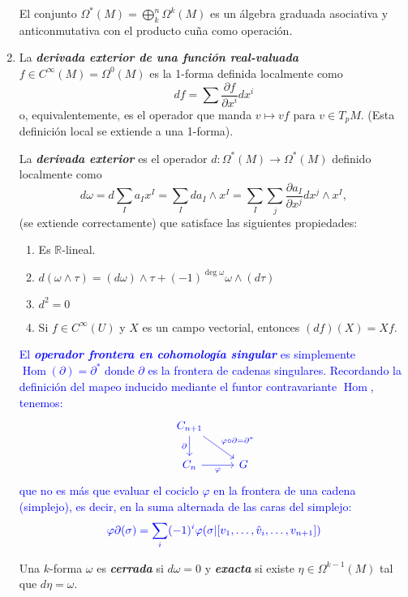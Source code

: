 \documentclass[spanish]{article}
\theoremstyle{definition}
\newcommand{\R}{\mathbb{R}}
\newcommand{\Cinf}{C^\infty}
\DeclareMathOperator{\Hom}{Hom}
\begin{document}
\begin{enumerate}
		El conjunto $\Omega^*(M)=\bigoplus_k^n\Omega^k(M)$ es un álgebra graduada asociativa y anticonmutativa con el producto cuña como operación.
		
		
		\item La \textbf{\textit{derivada exterior de una función real-valuada}} $f\in\Cinf(M)=\Omega^0(M)$ es la 1-forma definida localmente como
		\[df=\sum\frac{\partial f}{\partial x^i}dx^i\]
		o, equivalentemente, es el operador que manda $v\mapsto vf$ para $v\in T_pM$. (Esta definición local se extiende a una 1-forma).
		
		La \textbf{\textit{derivada exterior}} es el operador $d:\Omega^*(M)\to\Omega^*(M)$ definido localmente como
		\[d\omega=d\sum_Ia_Ix^I =\sum_Ida_I\wedge x^I=\sum_I\sum_j\frac{\partial a_I}{\partial x^j}dx^j\wedge x^I,\]
		(se extiende correctamente) que satisface las siguientes propiedades:
		\begin{enumerate}
			\item Es $\R$-lineal.
			\item $d(\omega\wedge\tau)=(d\omega)\wedge\tau+(-1)^{\deg\omega}\omega\wedge(d\tau)$
			\item $d^2=0$
			\item Si $f\in\Cinf(U)$ y $X$ es un campo vectorial, entonces $(df)(X)=Xf$.
			
		\end{enumerate}
		\textcolor{blue}{El \textbf{\textit{operador frontera en cohomología singular}} es simplemente $\Hom(\partial)=\partial^*$ donde $\partial$ es la frontera de cadenas singulares. Recordando la definición del mapeo inducido mediante el funtor contravariante $\Hom$, tenemos:}
		\[\begin{tikzcd}
			\textcolor{blue}{C_{n+1}}\arrow[d,blue,swap,"\partial"]\arrow[rd,blue,"\varphi\circ\partial=\partial^*"]\\	\textcolor{blue}{C_n}\arrow[blue,swap,r,"\varphi"]&\textcolor{blue}{G}
		\end{tikzcd}\]
		\textcolor{blue}{que no es más que evaluar el cociclo $\varphi$ en la frontera de una cadena (simplejo), es decir, en la suma alternada de las caras del simplejo:}
		\[\color{blue}\varphi\partial (\sigma)=\sum_i(-1)^i\varphi(\sigma|[v_1,\ldots,\hat{v}_i,\ldots,v_{n+1}])\]
		
		Una $k$-forma $\omega$ es \textbf{\textit{cerrada}} si $d\omega=0$ y \textbf{\textit{exacta}} si existe $\eta\in\Omega^{k-1}(M)$ tal que $d\eta=\omega$.
		

\end{enumerate}
\end{document}
